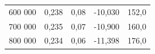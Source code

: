 \documentclass[a4paper, czech]{article}
\begin{document}
\begin{table}[H]
\begin{tabular}{rcccc}
        600 000     & 0,238                                                                       & 0,08                           & -10,030                                                      & 152,0                                                       \\
        700 000     & 0,235                                                                       & 0,07                           & -10,900                                                      & 160,0                                                           \\
        800 000     & 0,234                                                                       & 0,06                           & -11,398                                                      & 176,0                                                           \\
        \bottomrule
    \end{tabular}
\end{table}
\end{document}

